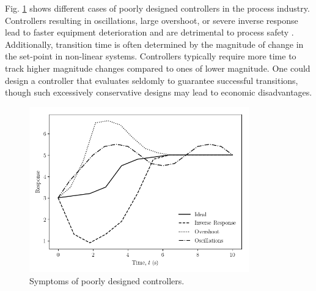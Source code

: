 Fig. \ref{fig:inv_overshoot_pid} shows different cases of poorly designed controllers in the process industry. Controllers resulting in oscillations, large overshoot, or severe inverse response lead to faster equipment deterioration and are detrimental to process safety \cite{process_control_ref13}. Additionally, transition time is often determined by the magnitude of change in the set-point in non-linear systems. Controllers typically require more time to track higher magnitude changes compared to ones of lower magnitude.  One could design a controller that evaluates seldomly to guarantee successful transitions, though such excessively conservative designs may lead to economic disadvantages.

\begin{figure}[H]
    \begin{center}
        \includegraphics[width=9.5cm]{images/ftc/inv_overshoot_pid.png}
        \caption{\label{fig:inv_overshoot_pid} Symptoms of poorly designed controllers.}
    \end{center}
\end{figure}

